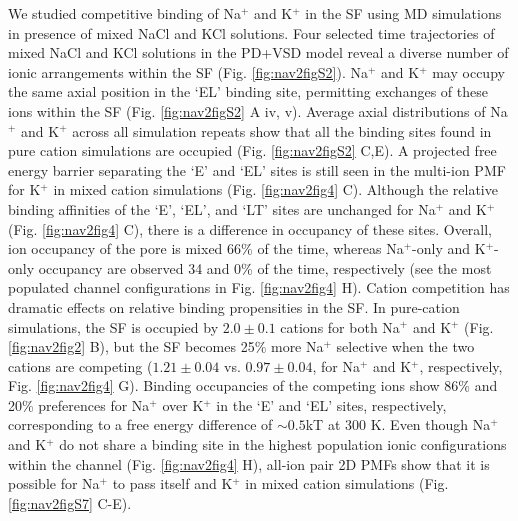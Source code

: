 \begin{refsection}

We studied competitive binding of Na$^+$ and K$^+$ in the SF using MD simulations in presence of mixed NaCl and KCl solutions. Four selected time trajectories of mixed NaCl and KCl solutions in the PD+VSD model reveal a diverse number of ionic arrangements within the SF (Fig.  \ref{fig:nav2figS2}). Na$^+$ and K$^+$ may occupy the same axial position in the `EL' binding site, permitting exchanges of these ions within the SF (Fig. \ref{fig:nav2figS2} A iv, v). Average axial distributions of Na$^+$ and K$^+$ across all simulation repeats show that all the binding sites found in pure cation simulations are occupied (Fig. \ref{fig:nav2figS2} C,E). A projected free energy barrier separating the `E' and `EL' sites is still seen in the multi-ion PMF for K$^+$ in mixed cation simulations (Fig. \ref{fig:nav2fig4} C). Although the relative binding affinities of the `E', `EL', and `LT' sites are unchanged for Na$^+$ and K$^+$ (Fig. \ref{fig:nav2fig4} C), there is a difference in occupancy of these sites. Overall, ion occupancy of the pore is mixed 66\% of the time, whereas Na$^+$-only and K$^+$-only occupancy are observed 34 and 0\% of the time, respectively (see the most populated channel configurations in Fig. \ref{fig:nav2fig4} H). Cation competition has dramatic effects on relative binding propensities in the SF. In pure-cation simulations, the SF is occupied by $2.0 \pm 0.1$ cations for both Na$^+$ and K$^+$ (Fig. \ref{fig:nav2fig2} B), but the SF becomes 25\% more Na$^+$ selective when the two cations are competing ($1.21 \pm 0.04$ vs. $0.97 \pm 0.04$, for Na$^+$ and K$^+$, respectively, Fig. \ref{fig:nav2fig4} G). Binding occupancies of the competing ions show 86\% and 20\% preferences for Na$^+$ over K$^+$ in the `E' and `EL' sites, respectively, corresponding to a free energy difference of $\sim 0.5$kT at 300 K. Even though Na$^+$ and K$^+$ do not share a binding site in the highest population ionic configurations within the channel (Fig. \ref{fig:nav2fig4} H), all-ion pair 2D PMFs show that it is possible for Na$^+$ to pass itself and K$^+$ in mixed cation simulations (Fig. \ref{fig:nav2figS7} C-E).


\end{refsection}
